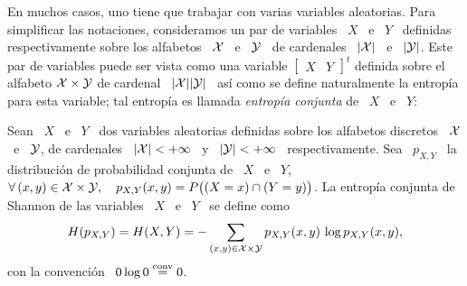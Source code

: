 En muchos  casos, uno tiene que  trabajar con varias  variables aleatorias. Para
simplificar las notaciones, consideramos  un par de variables \ $X$ \  e \ $Y$ \
definidas respectivamente sobre los alfabetos \ $\mathcal{X}$  \ e \ $\mathcal{Y}$ \ de cardenales \
$|\mathcal{X}|$ \ e \ $|\mathcal{Y}|$. Este par de variables puede ser vista como
una variable $\begin{bmatrix} X & Y\end{bmatrix}^t$ definida sobre el alfabeto $\mathcal{X}
\times  \mathcal{Y}$  de  cardenal \ $|\mathcal{X}| |\mathcal{Y}|$ \ as\'i como  se define  naturalmente  la
entrop\'ia  para  esta  variable;  tal entrop\'ia  es  llamada  {\it  entrop\'ia
  conjunta} de \ $X$ \ e \ $Y$:
%
\begin{definicion}
\label{Def:SZ:EntropiaConjunta}
%
  Sean \ $X$ \ e \ $Y$  \ dos variables aleatorias definidas sobre los alfabetos
  discretos \ $\mathcal{X}$  \ e \ $\mathcal{Y}$, de cardenales  \ $|\mathcal{X}| < +\infty$ \ y  \ $|\mathcal{Y}| <
  +\infty$  \  respectivamente.    Sea  \  $p_{X,Y}$  \   la  distribuci\'on  de
  probabilidad  conjunta   de  \   $X$  \  e   \  $Y$,  \   \ie  $   \forall  \,
  (x,y)  \in \mathcal{X}  \times  \mathcal{Y}, \quad  p_{X,Y}(x,y)  = P\big(  (X =  x)  \cap (Y  =
  y) \big)$.   La entrop\'ia conjunta de  Shannon de las  variables \ $X$ \  e \
  $Y$ \ se define como
  \[
  H(p_{X,Y}) =  H(X,Y) = -  \sum_{(x,y) \in \mathcal{X}  \times \mathcal{Y}} p_{X,Y}(x,y)  \, \log
  p_{X,Y}(x,y),
  \]
  con la convenci\'on \ $0 \log 0 \stackrel{\mathrm{conv}}{=} 0$.
\end{definicion}

